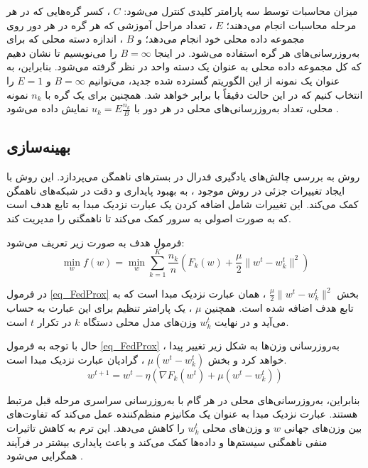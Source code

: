 میزان محاسبات توسط سه پارامتر کلیدی کنترل می‌شود:
$C$%
، کسر گره‌هایی که در هر مرحله محاسبات انجام می‌دهند؛
$E$%
، تعداد مراحل آموزشی که هر گره در هر دور روی مجموعه داده محلی خود انجام می‌دهد؛ و
$B$%
، اندازه دسته محلی که برای به‌روزرسانی‌های هر گره استفاده می‌شود. در اینجا
$B = \infty$
را می‌نویسیم تا نشان دهیم که کل مجموعه داده محلی به عنوان یک دسته واحد در نظر گرفته می‌شود. بنابراین، به عنوان یک نمونه از این الگوریتم گسترده شده جدید، می‌توانیم
$B = \infty$
و
$E = 1$
را انتخاب کنیم که در این حالت دقیقاً با
برابر خواهد شد. همچنین برای یک گره با
$n_k$
نمونه محلی، تعداد به‌روزرسانی‌های محلی در هر دور با
$u_k=E \frac{n_k}{B}$
نمایش داده می‌شود
\cite{mcmahan2017communication}.



\subsection{
بهینه‌سازی
}
روش
به بررسی چالش‌های یادگیری فدرال در بسترهای ناهمگن می‌پردازد. این روش با ایجاد تغییرات جزئی در روش موجود
%
، به بهبود پایداری و دقت در شبکه‌های ناهمگن کمک می‌کند. این تغییرات شامل اضافه کردن یک عبارت نزدیک مبدا%
به تابع هدف است که به صورت اصولی به سرور کمک می‌کند تا ناهمگنی را مدیریت کند.

فرمول هدف
به صورت زیر تعریف می‌شود:
\begin{equation}
\min_{w} f(w) = \min_{w} \sum_{k=1}^{K} \frac{n_k}{n} \left( F_k(w) + \frac{\mu}{2} \|w^t - w_k^t\|^2 \right)
\label{eq_FedProx}
\end{equation}

در فرمول
\ref{eq_FedProx}
بخش
$\frac{\mu}{2} \|w^t - w_k^t\|^2$%
، همان عبارت نزدیک مبدا است که به تابع هدف اضافه شده است. همچنین
$\mu$%
، یک پارامتر تنظیم برای این عبارت به حساب می‌آید و در نهایت
$w_k^t$
وزن‌های مدل محلی دستگاه
$k$
در تکرار
$t$
است.

حال با توجه به فرمول
\ref{eq_FedProx}%
، به‌روزرسانی وزن‌ها به شکل زیر تغییر پیدا خواهد کرد و بخش
$\mu (w^t - w_k^t)$%
، گرادیان عبارت نزدیک مبدا است.
\begin{equation*}
w^{t+1} = w^t - \eta (\nabla F_k(w^t) + \mu (w^t - w_k^t))
\end{equation*}

بنابراین، به‌روزرسانی‌های محلی در هر گام با به‌روزرسانی سراسری مرحله قبل مرتبط هستند. عبارت نزدیک مبدا به عنوان یک مکانیزم منظم‌کننده%
عمل می‌کند که تفاوت‌های بین وزن‌های جهانی
$w$
و وزن‌های محلی
$w_k^t$
را کاهش می‌دهد. این ترم به کاهش تاثیرات منفی ناهمگنی سیستم‌ها و داده‌ها کمک می‌کند و باعث پایداری بیشتر در فرآیند همگرایی می‌شود
\cite{li2020federatedheteroneneous}.

